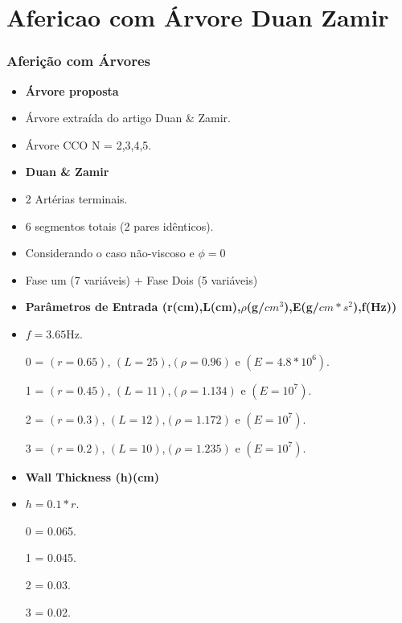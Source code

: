 \documentclass[10pt]{beamer}
\theoremstyle{remark}
\theoremstyle{definition}
\begin{document}
\section{Afericao com Árvore Duan  Zamir}
\begin{frame}[allowframebreaks]
\frametitle{Aferição com Árvores}
	
	\begin{itemize}
		\item \textbf{Árvore proposta}
		\item Árvore extraída do artigo Duan \& Zamir.
		\item Árvore CCO N = 2,3,4,5.
		
	\end{itemize}

	\framebreak
	
	\begin{itemize}
		\item \textbf{Duan \& Zamir}
		\item 2 Artérias terminais.
		\item 6 segmentos totais (2 pares idênticos).
		\item Considerando o caso não-viscoso e  $\phi = 0$
		\item Fase um (7 variáveis) + Fase Dois (5 variáveis)
		
	\end{itemize}

\framebreak

\begin{itemize}
\item \textbf{Parâmetros de Entrada (r(cm),L(cm),$\rho$(g/$cm^3$),E(g/$cm*s^2$),f(Hz))}
\item $ f =3.65$Hz.
\item [0] = $(r = 0.65)$, $(L = 25)$,$(\rho = 0.96)$ e $(E = 4.8 * 10^6)$.
\item [1] = $(r = 0.45)$, $(L = 11)$,$(\rho = 1.134)$ e $(E = 10^7)$.
\item [2] = $(r = 0.3)$, $(L = 12)$,$(\rho = 1.172)$ e $(E = 10^7)$.
\item [3] = $(r = 0.2)$, $(L = 10)$,$(\rho = 1.235)$ e $(E = 10^7)$.

\end{itemize}

\framebreak

\begin{itemize}
	\item \textbf{Wall Thickness (h)(cm)}
	\item $ h = 0.1 * r $.
	\item [0] = 0.065.
	\item [1] = 0.045.
	\item [2] = 0.03.
	\item [3] = 0.02.
	

\end{itemize}
\end{frame}
\end{document}
